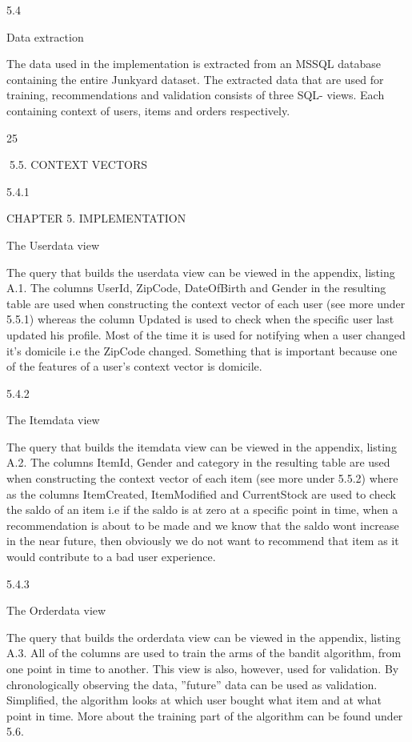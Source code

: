 5.4

Data extraction

The data used in the implementation is extracted from an MSSQL database containing
the entire Junkyard dataset. The extracted data that are used for training, recommendations and validation consists of three SQL- views. Each containing context of users,
items and orders respectively.

25

5.5. CONTEXT VECTORS

5.4.1

CHAPTER 5. IMPLEMENTATION

The Userdata view

The query that builds the userdata view can be viewed in the appendix, listing A.1. The
columns UserId, ZipCode, DateOfBirth and Gender in the resulting table are used when
constructing the context vector of each user (see more under 5.5.1) whereas the column
Updated is used to check when the specific user last updated his profile. Most of the
time it is used for notifying when a user changed it’s domicile i.e the ZipCode changed.
Something that is important because one of the features of a user’s context vector is
domicile.

5.4.2

The Itemdata view

The query that builds the itemdata view can be viewed in the appendix, listing A.2. The
columns ItemId, Gender and category in the resulting table are used when constructing
the context vector of each item (see more under 5.5.2) where as the columns ItemCreated,
ItemModified and CurrentStock are used to check the saldo of an item i.e if the saldo is
at zero at a specific point in time, when a recommendation is about to be made and we
know that the saldo wont increase in the near future, then obviously we do not want to
recommend that item as it would contribute to a bad user experience.

5.4.3

The Orderdata view

The query that builds the orderdata view can be viewed in the appendix, listing A.3. All
of the columns are used to train the arms of the bandit algorithm, from one point in time
to another. This view is also, however, used for validation. By chronologically observing
the data, ”future” data can be used as validation. Simplified, the algorithm looks at
which user bought what item and at what point in time. More about the training part
of the algorithm can be found under 5.6.

